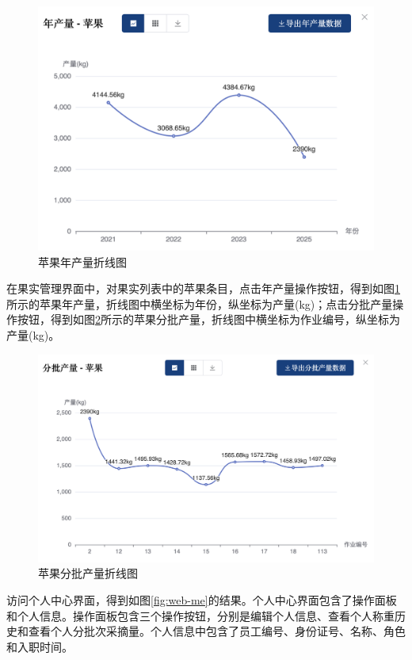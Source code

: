 \begin{figure}
    \centering
    \includegraphics[width=0.9\linewidth]{../result/chart-apple-year.png}
    \caption{苹果年产量折线图}
    \label{fig:chart-apple-year}
\end{figure}

在果实管理界面中，对果实列表中的苹果条目，点击年产量操作按钮，得到如图\ref{fig:chart-apple-year}所示的苹果年产量，折线图中横坐标为年份，纵坐标为产量(kg)；点击分批产量操作按钮，得到如图\ref{fig:chart-apple-works}所示的苹果分批产量，折线图中横坐标为作业编号，纵坐标为产量(kg)。

\begin{figure}
    \centering
    \includegraphics[width=0.9\linewidth]{../result/chart-apple-works.png}
    \caption{苹果分批产量折线图}
    \label{fig:chart-apple-works}
\end{figure}

访问个人中心界面，得到如图\ref{fig:web-me}的结果。个人中心界面包含了操作面板和个人信息。操作面板包含三个操作按钮，分别是编辑个人信息、查看个人称重历史和查看个人分批次采摘量。个人信息中包含了员工编号、身份证号、名称、角色和入职时间。

